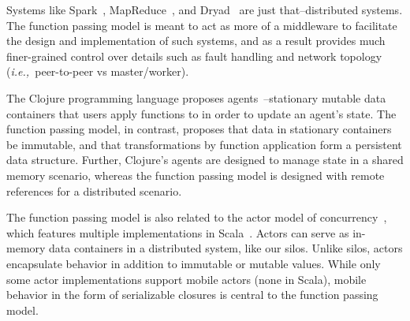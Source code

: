 \documentclass[10pt]{sigplanconf}
\theoremstyle{definition}
\theoremstyle{definition}
\newcommand{\ie}{{\em i.e.,~}}
\begin{document}

Systems like Spark~\cite{Spark}, MapReduce~\cite{MapReduce}, and
Dryad~\cite{Dryad} are just that--distributed systems. The function passing model is meant to act as
more of a middleware to facilitate the design and implementation of such
systems, and as a result provides much finer-grained control over details such
as fault handling and network topology (\ie peer-to-peer vs master/worker).

The Clojure programming language proposes agents~\cite{Clojure}--stationary
mutable data containers that users apply functions to in order to update an
agent's state. The function passing model, in contrast, proposes that data in stationary containers be
immutable, and that transformations by function application form a persistent
data structure. Further, Clojure's agents are designed to manage state in a
shared memory scenario, whereas the function passing model is designed with remote references for a
distributed scenario.

The function passing model is also related to the actor model of concurrency~\cite{Actors},
which features multiple implementations in
Scala~\cite{ScalaActors,Akka,TypedActors}. Actors can serve as in-memory data
containers in a distributed system, like our silos. Unlike silos, actors
encapsulate behavior in addition to immutable or mutable values. While only
some actor implementations support mobile actors (none in Scala), mobile
behavior in the form of serializable closures is central to the function passing model.


\end{document}

